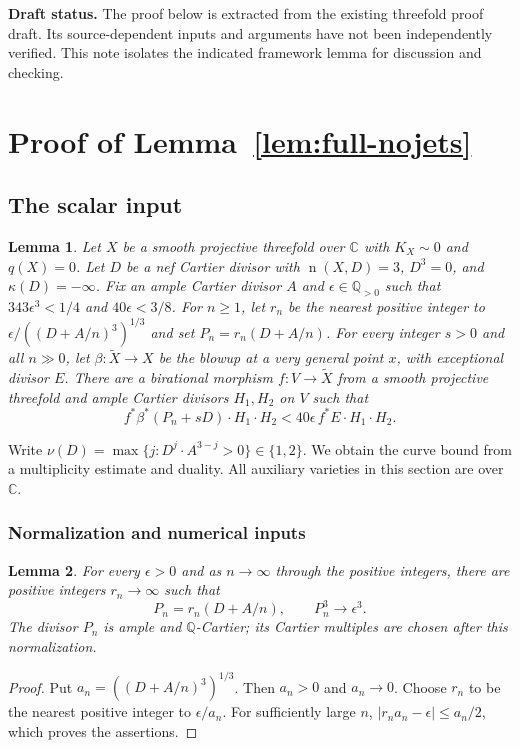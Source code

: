 \documentclass[12pt,a4paper,psamsfonts]{amsart}
\theoremstyle{definition}
\theoremstyle{plain}
\newtheorem{lemma}{Lemma}[section]
\newcommand{\Q}{\mathbb Q}
\newcommand{\C}{\mathbb C}
\newcommand{\nef}{\operatorname{n}}
\begin{document}
\medskip
\noindent\textbf{Draft status.}
The proof below is extracted from the existing threefold proof draft.
Its source-dependent inputs and arguments have not been independently
verified. This note isolates the indicated framework lemma for discussion
and checking.

\section{Proof of Lemma~\ref{lem:full-nojets}}

\subsection{The scalar input}\label{sec:geometric-inputs}

\begin{lemma}\label{lem:full-scalar}
Let $X$ be a smooth projective threefold over $\C$ with
$K_X\sim0$ and $q(X)=0$. Let $D$ be a nef Cartier divisor with
$\nef(X,D)=3$, $D^3=0$, and $\kappa(D)=-\infty$.
Fix an ample Cartier divisor $A$ and $\epsilon\in\Q_{>0}$ such that
$343\epsilon^3<1/4$ and $40\epsilon<3/8$.
For $n\ge1$, let $r_n$ be the nearest positive integer to
$\epsilon/((D+A/n)^3)^{1/3}$ and set $P_n=r_n(D+A/n)$.
For every integer $s>0$ and all $n\gg0$, let $\beta:\widetilde X\to X$
be the blowup at a very general point $x$, with exceptional divisor $E$.
There are a birational morphism $f:V\to\widetilde X$ from a smooth
projective threefold and ample Cartier divisors $H_1,H_2$ on $V$ such that
\[
 f^*\beta^*(P_n+sD)\cdot H_1\cdot H_2
 <40\epsilon\,f^*E\cdot H_1\cdot H_2.
\]
\end{lemma}

Write $\nu(D)=\max\{j:D^j\cdot A^{3-j}>0\}\in\{1,2\}$.
We obtain the curve bound from a multiplicity estimate and duality.
All auxiliary varieties in this section are over $\C$.

\subsubsection{Normalization and numerical inputs}\label{sec:lower-dimensional-inputs}

\begin{lemma}\label{lem:hd-normalization}
For every $\epsilon>0$ and
as $n\to\infty$ through the positive integers, there are
positive integers $r_n\to\infty$ such that
\[
 P_n=r_n(D+A/n),\qquad P_n^3\longrightarrow\epsilon^3.
\]
The divisor $P_n$ is ample and $\mathbb{Q}$-Cartier; its Cartier multiples
are chosen after this normalization.
\end{lemma}
\begin{proof}
Put $a_n=((D+A/n)^3)^{1/3}$. Then $a_n>0$ and $a_n\to0$.
Choose $r_n$ to be the nearest positive integer to $\epsilon/a_n$.
For sufficiently large $n$,
$|r_na_n-\epsilon|\le a_n/2$, which proves the assertions.
\end{proof}
\end{document}
